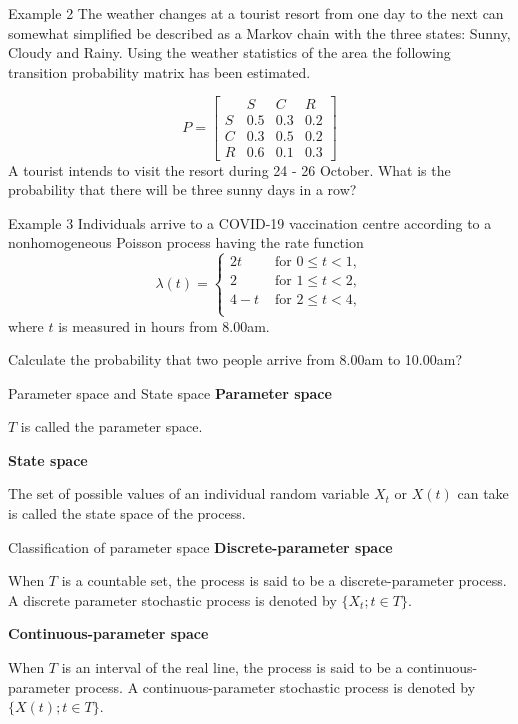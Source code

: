 \documentclass[12pt,ignorenonframetext,]{beamer}
\begin{document}
\begin{frame}{Example 2}
\protect\hypertarget{example-2}{}
The weather changes at a tourist resort from one day to the next can
somewhat simplified be described as a Markov chain with the three
states: Sunny, Cloudy and Rainy. Using the weather statistics of the
area the following transition probability matrix has been estimated.

\[P = \left[\begin{array}{cccc}
 & S & C & R\\
S & 0.5 & 0.3 & 0.2\\
C & 0.3 & 0.5 & 0.2\\
R & 0.6 & 0.1 & 0.3
\end{array}\right]\] A tourist intends to visit the resort during 24 -
26 October. What is the probability that there will be three sunny days
in a row?
\end{frame}

\begin{frame}{Example 3}
\protect\hypertarget{example-3}{}
Individuals arrive to a COVID-19 vaccination centre according to a
nonhomogeneous Poisson process having the rate function
\begin{equation*}
\lambda(t) = \begin{cases}
2t & \text{ for } 0 \leq t < 1, \\
2 & \text{ for } 1 \leq t < 2, \\
4-t & \text{ for } 2 \leq t < 4, \\
\end{cases}
\end{equation*} where \(t\) is measured in hours from 8.00am.

Calculate the probability that two people arrive from 8.00am to 10.00am?
\end{frame}

\begin{frame}{Parameter space and State space}
\protect\hypertarget{parameter-space-and-state-space}{}
\textbf{Parameter space}

\(T\) is called the parameter space.

\textbf{State space}

The set of possible values of an individual random variable \(X_t\) or
\(X(t)\) can take is called the state space of the process.
\end{frame}

\begin{frame}{Classification of parameter space}
\protect\hypertarget{classification-of-parameter-space}{}
\textbf{Discrete-parameter space}

When \(T\) is a countable set, the process is said to be a
discrete-parameter process. A discrete parameter stochastic process is
denoted by \(\{X_t; t \in T\}\).

\textbf{Continuous-parameter space}

When \(T\) is an interval of the real line, the process is said to be a
continuous-parameter process. A continuous-parameter stochastic process
is denoted by \(\{X(t); t \in T \}\).
\end{frame}
\end{document}
